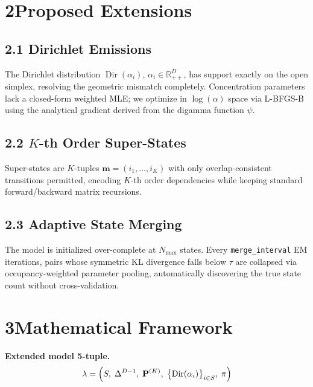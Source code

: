 \documentclass[10pt,a4paper,twocolumn]{article}
\DeclareMathOperator{\Dir}{Dir}
\begin{document}
\section*{2\quad Proposed Extensions}

\subsection*{2.1\; Dirichlet Emissions}
The Dirichlet distribution $\Dir(\alpha_i)$, $\alpha_i \in \mathbb{R}^D_{++}$,
has support exactly on the open simplex, resolving the geometric mismatch
completely.  Concentration parameters lack a closed-form weighted MLE; we
optimize in $\log(\alpha)$ space via L-BFGS-B using the analytical gradient
derived from the digamma function $\psi$.

\subsection*{2.2\; $K$-th Order Super-States}
Super-states are $K$-tuples $\mathbf{m} = (i_1, \ldots, i_K)$ with only
overlap-consistent transitions permitted, encoding $K$-th order dependencies
while keeping standard forward/backward matrix recursions.

\subsection*{2.3\; Adaptive State Merging}
The model is initialized over-complete at $N_{\max}$ states.  Every
\texttt{merge\_interval} EM iterations, pairs whose symmetric KL divergence
falls below $\tau$ are collapsed via occupancy-weighted parameter pooling,
automatically discovering the true state count without cross-validation.

\section*{3\quad Mathematical Framework}

\textbf{Extended model 5-tuple.}
\begin{equation}
  \lambda = \Bigl(S,\;\Delta^{D-1},\;\mathbf{P}^{(K)},\;
            \bigl\{\Dir(\alpha_i)\bigr\}_{i\in S},\;\pi\Bigr)
\end{equation}
\end{document}
